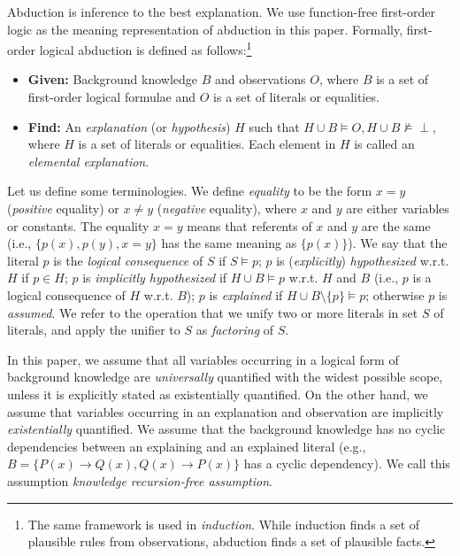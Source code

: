 \documentclass[english]{jnlp_1.4}
\begin{document}
Abduction is inference to the best explanation. We use function-free
first-order logic as the meaning representation of
abduction in this paper. 
Formally, first-order logical abduction is defined as follows:\footnote{The same framework is used in
  \emph{induction}. While induction finds a set of plausible rules
  from observations, abduction finds a set of plausible facts.}

\begin{itemize}
\item \textbf{Given:} Background knowledge $B$ and observations $O$,
  where $B$ is a set of first-order logical formulae and $O$ is a set
  of literals or equalities.
\item \textbf{Find:} An \emph{explanation} (or \emph{hypothesis}) $H$
  such that $H \cup B \models O, H \cup B \not\models \perp$, where
  $H$ is a set of literals or equalities. Each element in $H$ is
  called an \emph{elemental explanation}.
\end{itemize}
Let us define some terminologies. We define \emph{equality} to be the
form $x=y$ (\emph{positive} equality) or $x\not=y$ (\emph{negative}
equality), where $x$ and $y$ are either variables or constants. The
equality $x=y$ means that referents of $x$ and $y$ are the same
(i.e., $\{p(x), p(y), x=y\}$ has the same meaning as $\{p(x)\}$). We
say that the literal $p$ is the \emph{logical consequence} of $S$ if $S
\models p$; $p$ is (\emph{explicitly}) \emph{hypothesized} w.r.t. $H$
if $p \in H$; $p$ is \emph{implicitly hypothesized} if $H \cup B
\models p$ w.r.t. $H$ and $B$ (i.e., $p$ is a logical consequence of
$H$ w.r.t.  $B$); $p$ is \emph{explained} if $H \cup B \setminus \{p\}
\models p$; otherwise $p$ is \emph{assumed}. We refer to the operation
that we unify two or more literals in set $S$ of literals, and apply
the unifier to $S$ as \emph{factoring} of $S$. 

In this paper, we assume that all variables occurring in a logical
form of background knowledge are \emph{universally} quantified with
the widest possible scope, unless it is explicitly stated as
existentially quantified. On the other hand, we assume that variables
occurring in an explanation and observation are implicitly \emph{existentially}
quantified. We assume that the background knowledge has no
cyclic dependencies between an explaining and an explained
literal (e.g., $B=\{P(x) \rightarrow Q(x), Q(x) \rightarrow P(x)\}$ has
a cyclic dependency). We call this assumption \emph{knowledge
  recursion-free assumption}.
\end{document}
